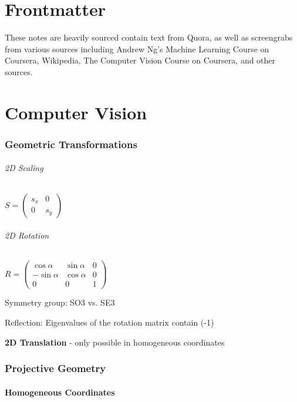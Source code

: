 \part{Frontmatter}

These notes are heavily sourced contain text from Quora, as well as screengrabs from various sources including Andrew Ng's Machine Learning Course on Coursera, Wikipedia, The Computer Vision Course on Coursera, and other sources. 


\part{Computer Vision}

\section{Geometric Transformations}

\paragraph{2D Scaling}

$S = \left( \begin{matrix} s_x & 0 \\ 0 & s_y  \end{matrix} \right)$

\paragraph{2D Rotation}

$R = \left(\begin{matrix} \cos  \alpha & \sin \alpha  & 0 \\  -\sin \alpha & \cos \alpha & 0 \\ 0 & 0 & 1  \end{matrix} \right)$

Symmetry group: SO3 vs. SE3

Reflection: Eigenvalues of the rotation matrix contain (-1)

\textbf{2D Translation} - only possible in homogeneous coordinates

\section{Projective Geometry}

\subsection{Homogeneous Coordinates}

